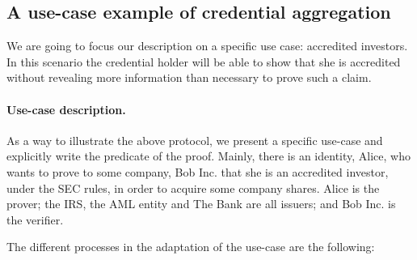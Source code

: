 \subsection{A use-case example of credential aggregation}
\label{sec:apps:id-framework:use-case-credential-aggregation}


We are going to focus our description on a specific use case: accredited investors. 
In this scenario the credential holder will be able to show that she is accredited without revealing more information than necessary to prove such a claim. 


\paragraph{Use-case description.}
As a way to illustrate the above protocol, we present a specific use-case and explicitly write the predicate of the proof. Mainly, there is an identity, Alice, who wants to prove to some company, Bob Inc. that she is an accredited investor, under the SEC rules, in order to acquire some company shares. Alice is the prover; the IRS, the AML entity and The Bank are all issuers; and Bob Inc. is the verifier.

The different processes in the adaptation of the use-case are the following:


